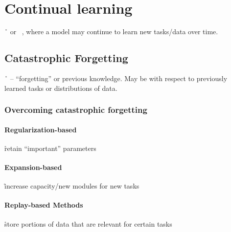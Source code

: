 \chapter{Continual learning}

\r{~\cite{ring1994continual} or ~\cite{thrun1998lifelong}, where a model may continue to learn new tasks/data over time.}





\section{Catastrophic Forgetting}

\r{~\cite{MCCLOSKEY1989109} -- ``forgetting'' or previous knowledge.  May be with respect to previously learned tasks or distributions of data.}


\subsection{Overcoming catastrophic forgetting}

\subsubsection{Regularization-based}

\r{retain ``important'' parameters}

\subsubsection{Expansion-based}

\r{increase capacity/new modules for new tasks}

\subsubsection{Replay-based Methods}

\r{store portions of data that are relevant for certain tasks}